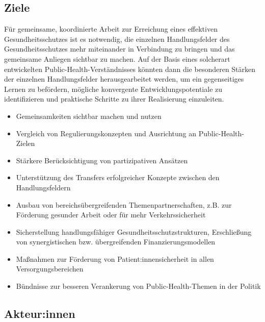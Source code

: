 \documentclass{article}
\begin{document}
\subsection{Ziele }\label{H6870933}



Für gemeinsame, koordinierte Arbeit zur Erreichung eines effektiven Gesundheitsschutzes ist es notwendig, die einzelnen Handlungsfelder des Gesundheitsschutzes mehr miteinander in Verbindung zu bringen und das gemeinsame Anliegen sichtbar zu machen. Auf der Basis eines solcherart entwickelten Public-Health-Verständnisses könnten dann die besonderen Stärken der einzelnen Handlungsfelder herausgearbeitet werden, um ein gegenseitiges Lernen zu befördern, mögliche konvergente Entwicklungspotentiale zu identifizieren und praktische Schritte zu ihrer Realisierung einzuleiten. 

\begin{itemize}
\item Gemeinsamkeiten sichtbar machen und nutzen


\item Vergleich von Regulierungskonzepten und Ausrichtung an Public-Health-Zielen


\item Stärkere Berücksichtigung von partizipativen Ansätzen


\item Unterstützung des Transfers erfolgreicher Konzepte zwischen den Handlungsfeldern


\item Ausbau von bereichsübergreifenden Themenpartnerschaften, z.B. zur Förderung gesunder Arbeit oder für mehr Verkehrssicherheit


\item Sicherstellung handlungsfähiger Gesundheitsschutzstrukturen, Erschließung von synergistischen bzw. übergreifenden Finanzierungsmodellen


\item Maßnahmen zur Förderung von Patient:innensicherheit in allen Versorgungsbereichen


\item Bündnisse zur besseren Verankerung von Public-Health-Themen in der Politik


\end{itemize}

\subsection{Akteur:innen}\label{H3915233}
\end{document}

